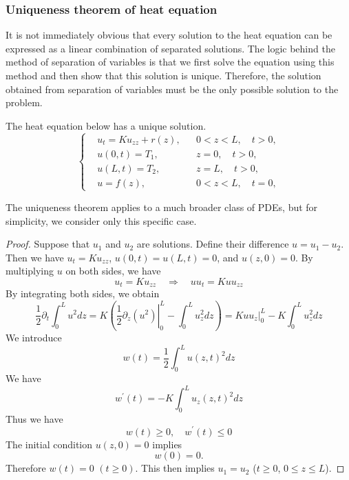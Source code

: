\subsubsection{Uniqueness theorem of heat equation}

It is not immediately obvious that every solution to the heat equation can be expressed as a linear combination of separated solutions. The logic behind the method of separation of variables is that we first solve the equation using this method and then show that this solution is unique. Therefore, the solution obtained from separation of variables must be the only possible solution to the problem.

\begin{theorem}[Uniqueness]
    The heat equation below has a unique solution.
    \begin{equation}
        \left\{\begin{aligned} 
            &u_t=K u_{z z} + r(z), && 0<z<L, \quad t>0, 
            \\ 
            &u(0, t)=T_1,\quad && z=0, \quad t>0, 
            \\ 
            &u(L, t)=T_2, && z=L, \quad t>0, 
            \\
            &u=f(z), && 0<z<L, \quad t=0,
        \end{aligned}\right.
    \end{equation}
\end{theorem}
\begin{remark} 
    The uniqueness theorem applies to a much broader class of PDEs, but for simplicity, we consider only this specific case. 
\end{remark}
\begin{proof} Suppose that $u_1$ and $u_2$ are solutions. Define their difference $u=u_1-u_2$. Then we have $u_t=K u_{z z}$, $u(0, t)=u(L, t)=0$, and $u(z, 0)=0$. By multiplying $u$ on both sides, we have
$$
u_t=K u_{z z} \quad \Rightarrow \quad u u_t=K u u_{z z} 
$$
By integrating both sides, we obtain
$$
\frac{1}{2} \partial_t \int_0^L u^2 d z=K\left(\left.\frac{1}{2} \partial_z (u^2)\right|_0 ^L-\int_0^L u_z^2 d z\right)=\left.K u u_z\right|_0 ^L-K \int_0^L u_z^2 d z
$$
We introduce
$$
w(t)=\frac{1}{2} \int_0^L u(z, t)^2 d z
$$
We have
$$
w^{\prime}(t)=-K \int_0^L u_z(z, t)^2 d z
$$
Thus we have
$$
w(t) \geq 0, \quad w^{\prime}(t) \leq 0
$$
The initial condition $u(z, 0)=0$ implies
$$
w(0)=0.
$$
Therefore $w(t)=0$ $(t \geq 0)$. This then implies $u_1=u_2$ ($t \geq 0$, $0 \leq z \leq L$).
\end{proof}

